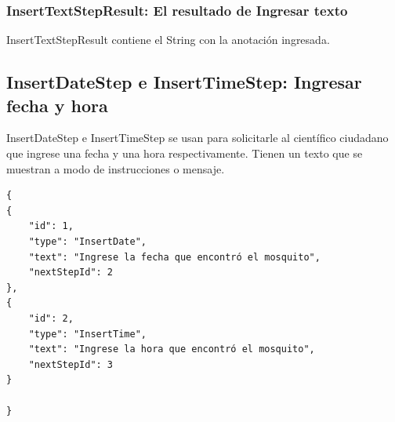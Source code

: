 \subsubsection{InsertTextStepResult: El resultado de Ingresar texto}
InsertTextStepResult contiene el String con la anotación ingresada.





\subsection{InsertDateStep e InsertTimeStep: Ingresar fecha y hora}
InsertDateStep e InsertTimeStep se usan para solicitarle al científico ciudadano que ingrese una fecha y una hora respectivamente. Tienen un texto que se muestran a modo de instrucciones o mensaje.

\clearpage

\begin{lstlisting}[language=XML, frame=tlbr, caption=InsertDateStep e InsertTimeStep usando el generador de clases.]	
{
{
	"id": 1,
	"type": "InsertDate",
	"text": "Ingrese la fecha que encontró el mosquito",
	"nextStepId": 2
},
{
	"id": 2,
	"type": "InsertTime",
	"text": "Ingrese la hora que encontró el mosquito",
	"nextStepId": 3
}	

}
\end{lstlisting}

